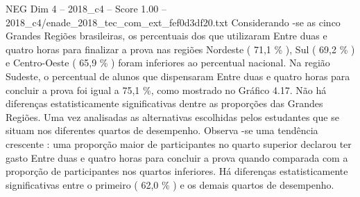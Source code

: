 \begin{textsample}{NEG Dim 4 – 2018\_c4 – Score 1.00 – 2018\_c4/enade\_2018\_tec\_com\_ext\_fef0d3df20.txt}
Considerando -se as cinco Grandes Regiões brasileiras, os percentuais dos que utilizaram Entre duas e quatro horas para finalizar a prova nas regiões Nordeste ( 71,1 \% ), Sul ( 69,2 \% ) e Centro-Oeste ( 65,9 \% ) foram inferiores ao percentual nacional.
Na região Sudeste, o percentual de alunos que dispensaram Entre duas e quatro horas para concluir a prova foi igual a 75,1 \%, como mostrado no Gráfico 4.17.
Não há diferenças estatisticamente significativas dentre as proporções das Grandes Regiões.
Uma vez analisadas as alternativas escolhidas pelos estudantes que se situam nos diferentes quartos de desempenho.
Observa -se uma tendência crescente : uma proporção maior de participantes no quarto superior declarou ter gasto Entre duas e quatro horas para concluir a prova quando comparada com a proporção de participantes nos quartos inferiores.
Há diferenças estatisticamente significativas entre o primeiro ( 62,0 \% ) e os demais quartos de desempenho.

\end{textsample}
